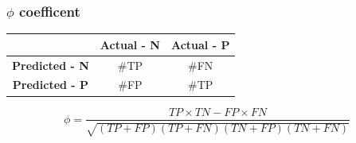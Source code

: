 \documentclass{beamer}
\begin{document}
\begin{frame}
\begin{center}
\frametitle{$\phi$ coefficent}
\begin{table}[]
\begin{tabular}{c|c|c}
\multicolumn{1}{l|}{\textbf{}} & \textbf{Actual - N} & \textbf{Actual - P} \\ \hline
\textbf{Predicted - N}         & \#TP                & \#FN                \\ \hline
\textbf{Predicted - P}         & \#FP                & \#TP               
\end{tabular}
\end{table}
\begin{equation*}
\phi=\dfrac{TP\times TN - FP\times FN}{\sqrt{\left(TP+FP\right)\left(TP+FN\right)\left(TN+FP\right)\left(TN+FN\right)}}
\end{equation*}
\end{center}
\end{frame}
\end{document}
